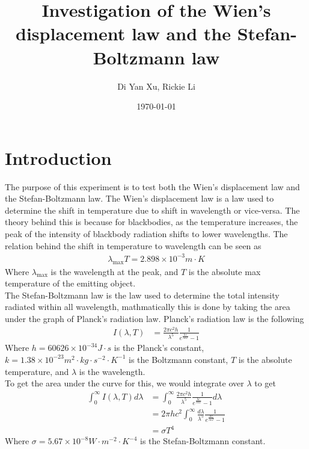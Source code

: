 \documentclass{article}
\title{Investigation of the Wien's displacement law and the Stefan-Boltzmann law}
\author{Di Yan Xu, Rickie Li}
\date{\today}
\begin{document}
\maketitle

\newpage

\section{Introduction}
The purpose of this experiment is to test both the Wien's displacement law and
the Stefan-Boltzmann law. The Wien's displacement law is a law used to determine
the shift in temperature due to shift in wavelength or vice-versa. The theory
behind this is because for blackbodies, as the temperature increases, the peak
of the intensity of blackbody radiation shifts to lower wavelengths. The relation
behind the shift in temperature to wavelength can be seen as
\begin{align*}
    \lambda_{\max}T = 2.898\times10^{-3}m\cdot K
\end{align*}
Where $\lambda_{\max}$ is the wavelength at the peak, and $T$ is the absolute max
temperature of the emitting object.\\
The Stefan-Boltzmann law is the law used to determine the total intensity radiated
within all wavelength, mathmatically this is done by taking the area under the
graph of Planck's radiation law. Planck's radiation law is the following
\begin{align*}
    I(\lambda, T) &= \frac{2\pi c^2h}{\lambda^5}\frac{1}{e^{\frac{hc}{\lambda kT}} - 1}
\end{align*}
Where $h = 60626\times 10^{-34}J\cdot s$ is the Planck's constant, $k = 1.38
\times 10^{-23}m^2\cdot kg\cdot s^{-2}\cdot K^{-1}$ is the Boltzmann constant,
$T$ is the absolute temperature, and $\lambda$ is the wavelength.\\
To get the area under the curve for this, we would integrate over $\lambda$ to get
\begin{align*}
    \int_0^{\infty}I(\lambda, T) d\lambda &= \int_0^{\infty}
    \frac{2\pi c^2h}{\lambda^5}\frac{1}{e^{\frac{hc}{\lambda kT}} - 1}d\lambda\\
    &= 2\pi hc^2\int_0^{\infty}\frac{d\lambda}{\lambda^5}\frac{1}{e^{\frac{hc}{\lambda kT}} - 1}\\
    &= \sigma T^4
\end{align*}
Where $\sigma = 5.67 \times 10^{-8}W\cdot m^{-2}\cdot K^{-4}$ is the Stefan-Boltzmann
constant.

\newpage
\end{document}
